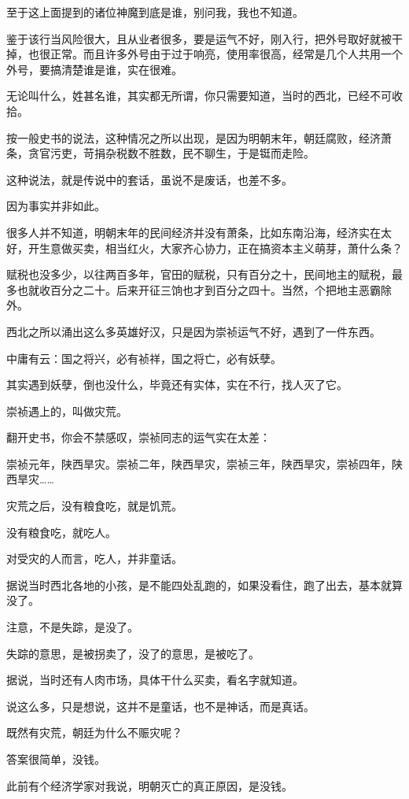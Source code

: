 \begin{multicols}{\theparacolNo}
		至于这上面提到的诸位神魔到底是谁，别问我，我也不知道。

		鉴于该行当风险很大，且从业者很多，要是运气不好，刚入行，把外号取好就被干掉，也很正常。而且许多外号由于过于响亮，使用率很高，经常是几个人共用一个外号，要搞清楚谁是谁，实在很难。

		无论叫什么，姓甚名谁，其实都无所谓，你只需要知道，当时的西北，已经不可收拾。

		按一般史书的说法，这种情况之所以出现，是因为明朝末年，朝廷腐败，经济萧条，贪官污吏，苛捐杂税数不胜数，民不聊生，于是铤而走险。

		这种说法，就是传说中的套话，虽说不是废话，也差不多。

		因为事实并非如此。

		很多人并不知道，明朝末年的民间经济并没有萧条，比如东南沿海，经济实在太好，开生意做买卖，相当红火，大家齐心协力，正在搞资本主义萌芽，萧什么条？

		赋税也没多少，以往两百多年，官田的赋税，只有百分之十，民间地主的赋税，最多也就收百分之二十。后来开征三饷也才到百分之四十。当然，个把地主恶霸除外。

		西北之所以涌出这么多英雄好汉，只是因为崇祯运气不好，遇到了一件东西。

		中庸有云：国之将兴，必有祯祥，国之将亡，必有妖孽。

		其实遇到妖孽，倒也没什么，毕竟还有实体，实在不行，找人灭了它。

		崇祯遇上的，叫做灾荒。

		翻开史书，你会不禁感叹，崇祯同志的运气实在太差：

		崇祯元年，陕西旱灾。崇祯二年，陕西旱灾，崇祯三年，陕西旱灾，崇祯四年，陕西旱灾……

		灾荒之后，没有粮食吃，就是饥荒。

		没有粮食吃，就吃人。

		对受灾的人而言，吃人，并非童话。

		据说当时西北各地的小孩，是不能四处乱跑的，如果没看住，跑了出去，基本就算没了。

		注意，不是失踪，是没了。

		失踪的意思，是被拐卖了，没了的意思，是被吃了。

		据说，当时还有人肉市场，具体干什么买卖，看名字就知道。

		说这么多，只是想说，这并不是童话，也不是神话，而是真话。

		既然有灾荒，朝廷为什么不赈灾呢？

		答案很简单，没钱。

		此前有个经济学家对我说，明朝灭亡的真正原因，是没钱。


\end{multicols}
